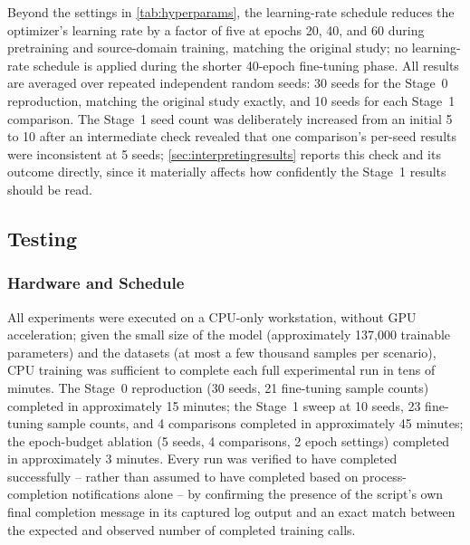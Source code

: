 \documentclass{iutbscthesis}
\begin{document}
Beyond the settings in \autoref{tab:hyperparams}, the learning-rate schedule reduces the optimizer's learning rate by a factor of five at epochs 20, 40, and 60 during pretraining and source-domain training, matching the original study; no learning-rate schedule is applied during the shorter 40-epoch fine-tuning phase. All results are averaged over repeated independent random seeds: 30 seeds for the Stage~0 reproduction, matching the original study exactly, and 10 seeds for each Stage~1 comparison. The Stage~1 seed count was deliberately increased from an initial 5 to 10 after an intermediate check revealed that one comparison's per-seed results were inconsistent at 5 seeds; \autoref{sec:interpretingresults} reports this check and its outcome directly, since it materially affects how confidently the Stage~1 results should be read.

\subsection{Testing}
\label{sec:testing}

\subsubsection{Hardware and Schedule}

All experiments were executed on a CPU-only workstation, without GPU acceleration; given the small size of the model (approximately 137,000 trainable parameters) and the datasets (at most a few thousand samples per scenario), CPU training was sufficient to complete each full experimental run in tens of minutes. The Stage~0 reproduction (30 seeds, 21 fine-tuning sample counts) completed in approximately 15 minutes; the Stage~1 sweep at 10 seeds, 23 fine-tuning sample counts, and 4 comparisons completed in approximately 45 minutes; the epoch-budget ablation (5 seeds, 4 comparisons, 2 epoch settings) completed in approximately 3 minutes. Every run was verified to have completed successfully -- rather than assumed to have completed based on process-completion notifications alone -- by confirming the presence of the script's own final completion message in its captured log output and an exact match between the expected and observed number of completed training calls.
\end{document}
